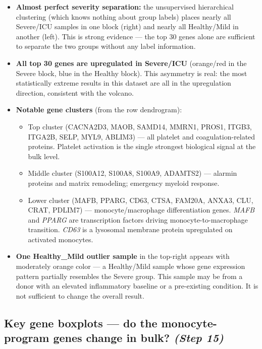 \documentclass[11pt, a4paper]{article}
\begin{document}
\begin{itemize}[nosep]
  \item \textbf{Almost perfect severity separation:} the unsupervised hierarchical
        clustering (which knows nothing about group labels) places nearly all
        Severe/ICU samples in one block (right) and nearly all Healthy/Mild in
        another (left). This is strong evidence — the top 30 genes alone are
        sufficient to separate the two groups without any label information.
  \item \textbf{All top 30 genes are upregulated in Severe/ICU} (orange/red
        in the Severe block, blue in the Healthy block). This asymmetry is
        real: the most statistically extreme results in this dataset are all
        in the upregulation direction, consistent with the volcano.
  \item \textbf{Notable gene clusters} (from the row dendrogram):
        \begin{itemize}[nosep]
          \item Top cluster (CACNA2D3, MAOB, SAMD14, MMRN1, PROS1, ITGB3,
                ITGA2B, SELP, MYL9, ABLIM3) — all platelet and
                coagulation-related proteins. Platelet activation is the
                single strongest biological signal at the bulk level.
          \item Middle cluster (S100A12, S100A8, S100A9, ADAMTS2) — alarmin
                proteins and matrix remodeling; emergency myeloid response.
          \item Lower cluster (MAFB, PPARG, CD63, CTSA, FAM20A, ANXA3,
                CLU, CRAT, PDLIM7) — monocyte/macrophage differentiation genes.
                \textit{MAFB} and \textit{PPARG} are transcription factors
                driving monocyte-to-macrophage transition. \textit{CD63}
                is a lysosomal membrane protein upregulated on activated monocytes.
        \end{itemize}
  \item \textbf{One Healthy\_Mild outlier sample} in the top-right appears with
        moderately orange color — a Healthy/Mild sample whose gene expression
        pattern partially resembles the Severe group. This sample may be from
        a donor with an elevated inflammatory baseline or a pre-existing condition.
        It is not sufficient to change the overall result.
\end{itemize}

\subsection{Key gene boxplots — do the monocyte-program genes change in bulk? \small\normalfont\textit{(Step 15)}}
\end{document}
